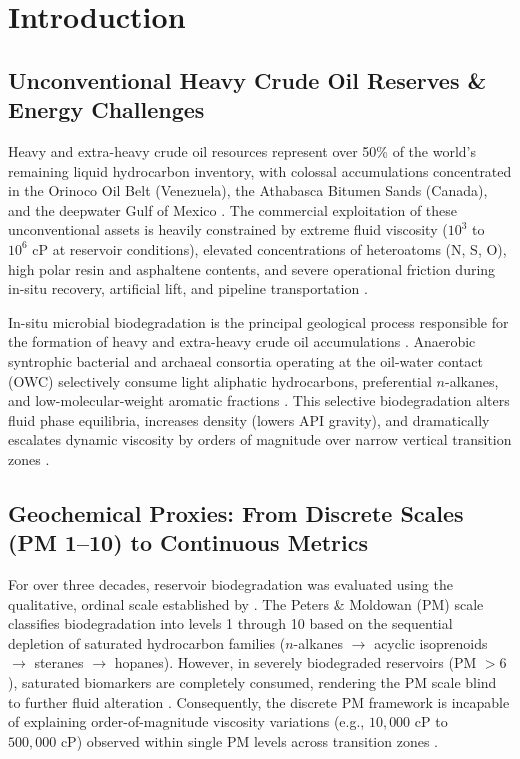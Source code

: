 \documentclass[review,12pt]{elsarticle}
\begin{document}
\linenumbers

\section{Introduction}

\subsection{Unconventional Heavy Crude Oil Reserves \& Energy Challenges}
Heavy and extra-heavy crude oil resources represent over 50\% of the world's remaining liquid hydrocarbon inventory, with colossal accumulations concentrated in the Orinoco Oil Belt (Venezuela), the Athabasca Bitumen Sands (Canada), and the deepwater Gulf of Mexico \citep{head2003biological, larter2006controls, roadifer1987size}. The commercial exploitation of these unconventional assets is heavily constrained by extreme fluid viscosity ($10^3$ to $10^6\text{ cP}$ at reservoir conditions), elevated concentrations of heteroatoms (N, S, O), high polar resin and asphaltene contents, and severe operational friction during in-situ recovery, artificial lift, and pipeline transportation \citep{bennett2008quantitative, meyer2007heavy, perez2019thermodynamic}.

In-situ microbial biodegradation is the principal geological process responsible for the formation of heavy and extra-heavy crude oil accumulations \citep{wilhelms2001biodegradation, magot2000microbiology}. Anaerobic syntrophic bacterial and archaeal consortia operating at the oil-water contact (OWC) selectively consume light aliphatic hydrocarbons, preferential $n$-alkanes, and low-molecular-weight aromatic fractions \citep{jones2008crude, head2014microbial}. This selective biodegradation alters fluid phase equilibria, increases density (lowers API gravity), and dramatically escalates dynamic viscosity by orders of magnitude over narrow vertical transition zones \citep{huang2013impact, larter2003molecular}.

\subsection{Geochemical Proxies: From Discrete Scales (PM 1--10) to Continuous Metrics}
For over three decades, reservoir biodegradation was evaluated using the qualitative, ordinal scale established by \citet{peters1993biomarker}. The Peters \& Moldowan (PM) scale classifies biodegradation into levels 1 through 10 based on the sequential depletion of saturated hydrocarbon families ($n$-alkanes $\rightarrow$ acyclic isoprenoids $\rightarrow$ steranes $\rightarrow$ hopanes). However, in severely biodegraded reservoirs (PM $> 6$), saturated biomarkers are completely consumed, rendering the PM scale blind to further fluid alteration \citep{wilhelms2001biodegradation, bennett2008quantitative}. Consequently, the discrete PM framework is incapable of explaining order-of-magnitude viscosity variations (e.g., $10,000\text{ cP}$ to $500,000\text{ cP}$) observed within single PM levels across transition zones \citep{larter2003molecular}.
\end{document}
